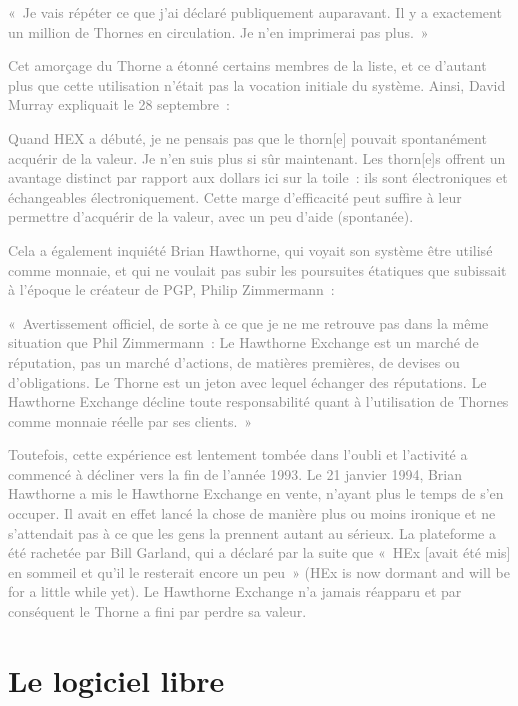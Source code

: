 \textcolor{gray}{«~Je vais répéter ce que j'ai déclaré publiquement auparavant. Il y a exactement un million de Thornes en circulation. Je n'en imprimerai pas plus.~»}

\textcolor{gray}{Cet amorçage du Thorne a étonné certains membres de la liste, et ce d'autant plus que cette utilisation n'était pas la vocation initiale du système. Ainsi, David Murray expliquait le 28 septembre~:}

\textcolor{gray}{Quand HEX a débuté, je ne pensais pas que le thorn[e] pouvait spontanément acquérir de la valeur. Je n'en suis plus si sûr maintenant. Les thorn[e]s offrent un avantage distinct par rapport aux dollars ici sur la toile~: ils sont électroniques et échangeables électroniquement. Cette marge d'efficacité peut suffire à leur permettre d'acquérir de la valeur, avec un peu d'aide (spontanée).}

\textcolor{gray}{Cela a également inquiété Brian Hawthorne, qui voyait son système être utilisé comme monnaie, et qui ne voulait pas subir les poursuites étatiques que subissait à l'époque le créateur de PGP, Philip Zimmermann~:}

\textcolor{gray}{«~Avertissement officiel, de sorte à ce que je ne me retrouve pas dans la même situation que Phil Zimmermann~: Le Hawthorne Exchange est un marché de réputation, pas un marché d'actions, de matières premières, de devises ou d'obligations. Le Thorne est un jeton avec lequel échanger des réputations. Le Hawthorne Exchange décline toute responsabilité quant à l'utilisation de Thornes comme monnaie réelle par ses clients.~»}

\textcolor{gray}{Toutefois, cette expérience est lentement tombée dans l'oubli et l'activité a commencé à décliner vers la fin de l'année 1993. Le 21 janvier 1994, Brian Hawthorne a mis le Hawthorne Exchange en vente, n'ayant plus le temps de s'en occuper. Il avait en effet lancé la chose de manière plus ou moins ironique et ne s'attendait pas à ce que les gens la prennent autant au sérieux. La plateforme a été rachetée par Bill Garland, qui a déclaré par la suite que «~HEx [avait été mis] en sommeil et qu'il le resterait encore un peu~» (HEx is now dormant and will be for a little while yet). Le Hawthorne Exchange n'a jamais réapparu et par conséquent le Thorne a fini par perdre sa valeur.}

\section{Le logiciel libre}

